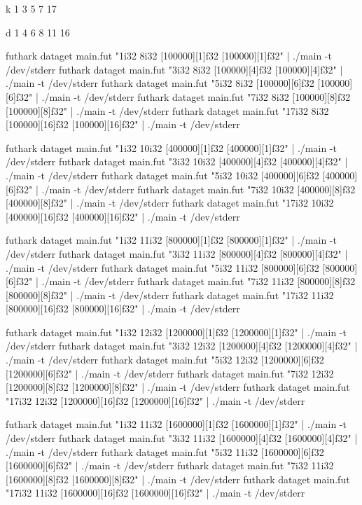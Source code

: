 k
1
3
5
7
17

d
1
4
6
8
11
16


futhark dataget main.fut "1i32  8i32 [100000][1]f32  [100000][1]f32" | ./main -t /dev/stderr
futhark dataget main.fut "3i32  8i32 [100000][4]f32  [100000][4]f32" | ./main -t /dev/stderr
futhark dataget main.fut "5i32  8i32 [100000][6]f32  [100000][6]f32" | ./main -t /dev/stderr
futhark dataget main.fut "7i32  8i32 [100000][8]f32  [100000][8]f32" | ./main -t /dev/stderr
futhark dataget main.fut "17i32 8i32 [100000][16]f32 [100000][16]f32" | ./main -t /dev/stderr

futhark dataget main.fut "1i32  10i32 [400000][1]f32  [400000][1]f32" | ./main -t /dev/stderr
futhark dataget main.fut "3i32  10i32 [400000][4]f32  [400000][4]f32" | ./main -t /dev/stderr
futhark dataget main.fut "5i32  10i32 [400000][6]f32  [400000][6]f32" | ./main -t /dev/stderr
futhark dataget main.fut "7i32  10i32 [400000][8]f32  [400000][8]f32" | ./main -t /dev/stderr
futhark dataget main.fut "17i32 10i32 [400000][16]f32 [400000][16]f32" | ./main -t /dev/stderr

futhark dataget main.fut "1i32  11i32 [800000][1]f32  [800000][1]f32" | ./main -t /dev/stderr
futhark dataget main.fut "3i32  11i32 [800000][4]f32  [800000][4]f32" | ./main -t /dev/stderr
futhark dataget main.fut "5i32  11i32 [800000][6]f32  [800000][6]f32" | ./main -t /dev/stderr
futhark dataget main.fut "7i32  11i32 [800000][8]f32  [800000][8]f32" | ./main -t /dev/stderr
futhark dataget main.fut "17i32 11i32 [800000][16]f32 [800000][16]f32" | ./main -t /dev/stderr

futhark dataget main.fut "1i32  12i32 [1200000][1]f32  [1200000][1]f32" | ./main -t /dev/stderr
futhark dataget main.fut "3i32  12i32 [1200000][4]f32  [1200000][4]f32" | ./main -t /dev/stderr
futhark dataget main.fut "5i32  12i32 [1200000][6]f32  [1200000][6]f32" | ./main -t /dev/stderr
futhark dataget main.fut "7i32  12i32 [1200000][8]f32  [1200000][8]f32" | ./main -t /dev/stderr
futhark dataget main.fut "17i32 12i32 [1200000][16]f32 [1200000][16]f32" | ./main -t /dev/stderr

futhark dataget main.fut "1i32  11i32 [1600000][1]f32  [1600000][1]f32" | ./main -t /dev/stderr
futhark dataget main.fut "3i32  11i32 [1600000][4]f32  [1600000][4]f32" | ./main -t /dev/stderr
futhark dataget main.fut "5i32  11i32 [1600000][6]f32  [1600000][6]f32" | ./main -t /dev/stderr
futhark dataget main.fut "7i32  11i32 [1600000][8]f32  [1600000][8]f32" | ./main -t /dev/stderr
futhark dataget main.fut "17i32 11i32 [1600000][16]f32 [1600000][16]f32" | ./main -t /dev/stderr


